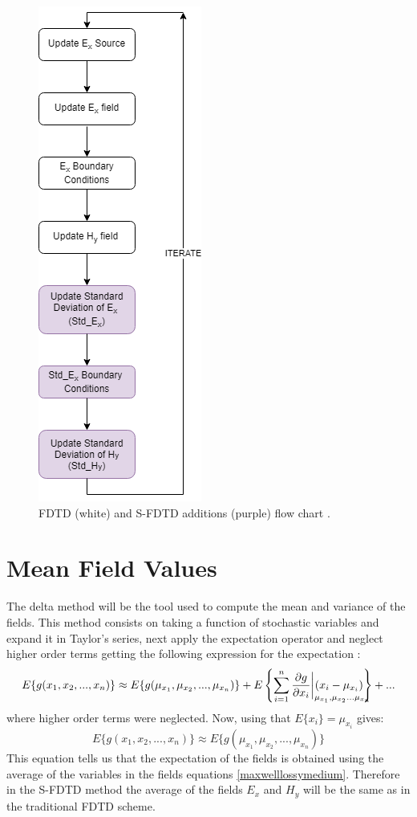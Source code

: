 \documentclass[12pt, oneside]{book}
\begin{document}
\begin{figure}\label{sfdtdalgorithmfigure}
\centering
\includegraphics[scale=0.7]{diagramsfdtddef.png}
\caption{FDTD (white) and S-FDTD additions (purple) flow chart \cite{smith2012stochastic}.}
\end{figure}

\section{Mean Field Values}
The delta method \cite{casella2021statistical} will be the tool used to compute the mean and variance of the fields. This method consists on taking a function of stochastic variables and expand it in Taylor's series, next apply the expectation operator and neglect higher order terms getting the following expression for the expectation \cite{smith2012stochastic}:
\begin{equation}
E\lbrace g(x_1,x_2,...,x_n)\rbrace \approx E\lbrace g(\mu_{x_1},\mu_{x_2},...,\mu_{x_n})\rbrace + E \left\lbrace \sum_{i=1}^n \frac{\partial g}{\partial x_i}\bigg |_{\mathrlap{\mu_{x_1},\mu_{x_2}...\mu_{x_n}}}(x_i-\mu_{x_i}) \right\rbrace + ...
\end{equation}
where higher order terms were neglected. Now, using that $E\lbrace x_i\rbrace =\mu_{x_i}$ gives:
\begin{equation}
E\lbrace g(x_1,x_2,...,x_n)\rbrace \approx E\lbrace g(\mu_{x_1},\mu_{x_2},...,\mu_{x_n})\rbrace
\end{equation}
This equation tells us that the expectation of the fields is obtained using the average of the variables in the fields equations \ref{maxwelllossymedium}. Therefore in the S-FDTD method the average of the fields $E_x$ and $H_y$ will be the same as in the traditional FDTD scheme.
\end{document}
